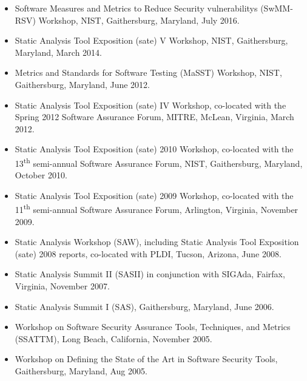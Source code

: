 \begin{itemize}
    \item Software Measures and Metrics to Reduce Security \Glspl{vulnerability} (SwMM-RSV) Workshop, NIST, Gaithersburg, Maryland, July 2016.
    \item Static Analysis Tool Exposition (\gls{sate}) V Workshop, NIST, Gaithersburg, Maryland, March 2014.
    \item Metrics and Standards for Software Testing (MaSST) Workshop, NIST, Gaithersburg, Maryland, June 2012. 
    \item Static Analysis Tool Exposition (\gls{sate}) IV Workshop, co-located with the Spring 2012 Software Assurance Forum, MITRE, McLean, Virginia, March 2012.
    \item Static Analysis Tool Exposition (\gls{sate}) 2010 Workshop, co-located with the 13\textsuperscript{th} semi-annual Software Assurance Forum, NIST, Gaithersburg, Maryland, October 2010.
    \item Static Analysis Tool Exposition (\gls{sate}) 2009 Workshop, co-located with the 11\textsuperscript{th} semi-annual Software Assurance Forum, Arlington, Virginia, November 2009.
    \item Static Analysis Workshop (SAW), including Static Analysis Tool Exposition (\gls{sate}) 2008 reports, co-located with PLDI, Tucson, Arizona, June 2008.
    \item Static Analysis Summit II (SASII) in conjunction with SIGAda, Fairfax, Virginia, November 2007.
    \item Static Analysis Summit I (SAS), Gaithersburg, Maryland, June 2006.
    \item Workshop on Software Security Assurance Tools, Techniques, and Metrics (SSATTM), Long Beach, California, November 2005.
    \item Workshop on Defining the State of the Art in Software Security Tools, Gaithersburg, Maryland, Aug 2005.
\end{itemize}

\clearpage